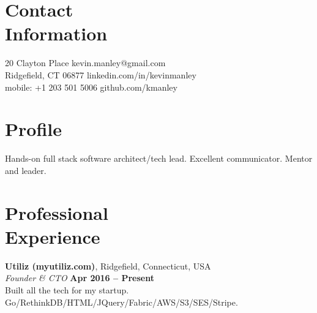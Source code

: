 \documentclass[margin,line]{resume}
\begin{document}
\begin{resume}

    \section{\mysidestyle Contact\\Information}

    20 Clayton Place			                            \hfill kevin.manley@gmail.com       \vspace{0mm}\\\vspace{0mm}%
    Ridgefield, CT 06877                                    \hfill linkedin.com/in/kevinmanley        \vspace{0mm}\\\vspace{0mm}%
    mobile: +1 203 501 5006 					\hfill github.com/kmanley  \vspace{0mm}\\\vspace{-4.5mm}%


    \section{\mysidestyle Profile}

    Hands-on full stack software architect/tech lead. Excellent communicator. Mentor and leader.


    
    \section{\mysidestyle Professional\\Experience}

    \textbf{Utiliz (myutiliz.com)}, Ridgefield, Connecticut, USA\\
    \textsl{Founder \& CTO} \hfill \textbf{Apr 2016 -- Present}\\
    Built all the tech for my startup. Go/RethinkDB/HTML/JQuery/Fabric/AWS/S3/SES/Stripe.


\end{resume}
\end{document}
